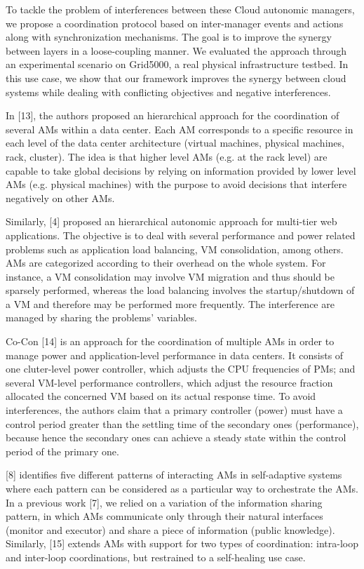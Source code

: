 To tackle the problem of interferences between these Cloud autonomic managers, we propose a coordination protocol based on inter-manager events and actions along with synchronization mechanisms. The goal is to improve the synergy between layers in a loose-coupling manner. We evaluated the approach through an experimental scenario on Grid5000, a real physical infrastructure testbed. In this use case, we show that our framework improves the synergy between cloud systems while dealing with conflicting objectives and negative interferences.

In [13], the authors proposed an hierarchical approach for
the coordination of several AMs within a data center. Each
AM corresponds to a specific resource in each level of the
data center architecture (virtual machines, physical machines,
rack, cluster). The idea is that higher level AMs (e.g. at the
rack level) are capable to take global decisions by relying
on information provided by lower level AMs (e.g. physical
machines) with the purpose to avoid decisions that interfere
negatively on other AMs.

Similarly, [4] proposed an hierarchical autonomic approach
for multi-tier web applications. The objective is to deal with
several performance and power related problems such as
application load balancing, VM consolidation, among others.
AMs are categorized according to their overhead on the whole
system. For instance, a VM consolidation may involve VM
migration and thus should be sparsely performed, whereas the
load balancing involves the startup/shutdown of a VM and
therefore may be performed more frequently. The interference are managed by sharing the problems’ variables.

Co-Con [14] is an approach for the coordination of multiple AMs in order to manage power and application-level performance in data centers. It consists of one cluter-level power controller, which adjusts the CPU frequencies of PMs; and several VM-level performance controllers, which adjust the resource fraction allocated the concerned VM based on its actual response time. To avoid interferences, the authors claim that a primary controller (power) must have a control period greater than the settling time of the secondary ones (performance), because hence the secondary ones can achieve a steady state within the control period of the primary one.

[8] identifies five different patterns of interacting AMs in
self-adaptive systems where each pattern can be considered as
a particular way to orchestrate the AMs. In a previous work [7],
we relied on a variation of the information sharing pattern, in
which AMs communicate only through their natural interfaces
(monitor and executor) and share a piece of information (public
knowledge). Similarly, [15] extends AMs with support for two
types of coordination: intra-loop and inter-loop coordinations,
but restrained to a self-healing use case.

